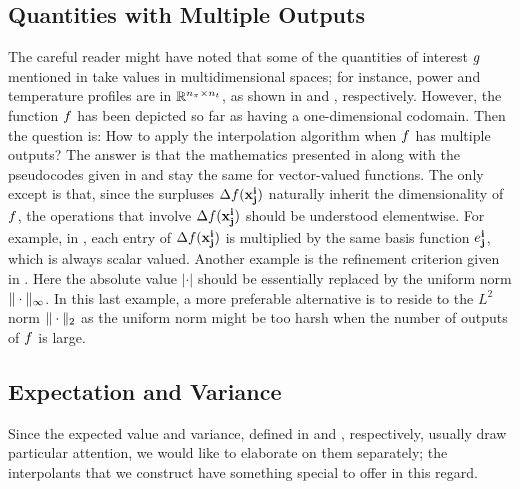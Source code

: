 \subsection{Quantities with Multiple Outputs}
The careful reader might have noted that some of the quantities of interest $g$
mentioned in  take values in multidimensional spaces; for
instance, power and temperature profiles are in $\mathbb{R}^{{n_\pi} \times {n_t}}$, as
shown in  and , respectively.
However, the function $f$ has been depicted so far as having a one-dimensional
codomain. Then the question is: How to apply the interpolation algorithm when
$f$ has multiple outputs? The answer is that the mathematics presented in
 along with the pseudocodes given in  and
 stay the same for vector-valued functions. The only except is
that, since the surpluses $\Delta f(\mathbf{x}^{\mathbf{i}}_{\mathbf{j}})$ naturally inherit the
dimensionality of $f$, the operations that involve $\Delta f(\mathbf{x}^{\mathbf{i}}_{\mathbf{j}})$
should be understood elementwise. For example, in ,
each entry of $\Delta f(\mathbf{x}^{\mathbf{i}}_{\mathbf{j}})$ is multiplied by the same basis function
$e^{\mathbf{i}}_{\mathbf{j}}$, which is always scalar valued. Another example is the refinement
criterion given in . Here the absolute value $|\cdot|$ should be
essentially replaced by the uniform norm $\| \cdot \|_\infty$. In this last
example, a more preferable alternative is to reside to the $L^2$ norm
$\| \cdot \|_2$ as the uniform norm might be too harsh when the number of
outputs of $f$ is large.

\subsection{Expectation and Variance} 
Since the expected value and variance, defined in  and
, respectively, usually draw particular attention, we would like
to elaborate on them separately; the interpolants that we construct have
something special to offer in this regard.

